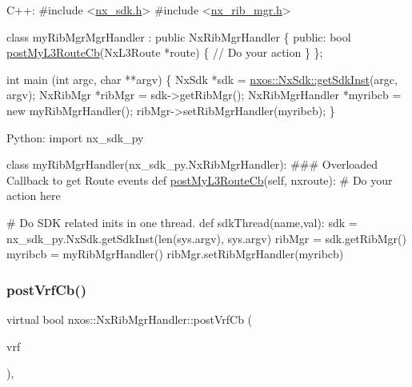 \begin{DoxyCode}
C++:
\textcolor{preprocessor}{   #include <\mbox{\hyperlink{nx__sdk_8h}{nx\_sdk.h}}>}
\textcolor{preprocessor}{   #include <\mbox{\hyperlink{nx__rib__mgr_8h}{nx\_rib\_mgr.h}}>}

   \textcolor{keyword}{class }myRibMgrMgrHandler : \textcolor{keyword}{public} NxRibMgrHandler \{
      \textcolor{keyword}{public}:
         \textcolor{keywordtype}{bool} \mbox{\hyperlink{classnxos_1_1_nx_rib_mgr_handler_af4214a821d17a84b4746b0dd94b5d58b}{postMyL3RouteCb}}(NxL3Route *route) \{
              \textcolor{comment}{// Do your action}
         \}
   \};

   \textcolor{keywordtype}{int}  main (\textcolor{keywordtype}{int} argc, \textcolor{keywordtype}{char} **argv)
   \{
        NxSdk    *sdk = \mbox{\hyperlink{classnxos_1_1_nx_sdk_a5050e2d26c40744b4fc7862068a83f39}{nxos::NxSdk::getSdkInst}}(argc, argv);
        NxRibMgr *ribMgr = sdk->getRibMgr();
        NxRibMgrHandler *myribcb = \textcolor{keyword}{new} myRibMgrHandler();
        ribMgr->setRibMgrHandler(myribcb);
   \}

Python:
   \textcolor{keyword}{import} nx\_sdk\_py

   \textcolor{keyword}{class }myRibMgrHandler(nx\_sdk\_py.NxRibMgrHandler):
\textcolor{preprocessor}{   ### Overloaded Callback to get Route events}
         def \mbox{\hyperlink{classnxos_1_1_nx_rib_mgr_handler_af4214a821d17a84b4746b0dd94b5d58b}{postMyL3RouteCb}}(self, nxroute):
\textcolor{preprocessor}{             # Do your action here}

\textcolor{preprocessor}{   # Do SDK related inits in one thread.}
   def sdkThread(name,val):
       sdk = nx\_sdk\_py.NxSdk.getSdkInst(len(sys.argv), sys.argv)
       ribMgr = sdk.getRibMgr()
       myribcb = myRibMgrHandler()
       ribMgr.setRibMgrHandler(myribcb)
\end{DoxyCode}
 \mbox{\label{classnxos_1_1_nx_rib_mgr_handler_a2ed5a3ad9c0e55d21e18d88a19419a5e}} 
\subsubsection{\texorpdfstring{post\+Vrf\+Cb()}{postVrfCb()}}
{\footnotesize\ttfamily virtual bool nxos\+::\+Nx\+Rib\+Mgr\+Handler\+::post\+Vrf\+Cb (\begin{DoxyParamCaption}\item[{\mbox{\hyperlink{classnxos_1_1_nx_vrf}{Nx\+Vrf}} $\ast$}]{vrf }\end{DoxyParamCaption})\hspace{0.3cm}{\ttfamily [inline]}, {\ttfamily [virtual]}}

